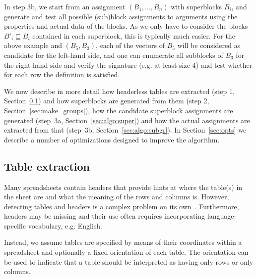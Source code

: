 \documentclass{IEEEtran}
\newcommand{\sbs}{B}
\newcommand{\sbl}[1]{\ensuremath{\sbs_{\textit{#1}}}}
\newcommand{\ssbl}[1]{\ensuremath{\sbs'_{\textit{#1}}}}
\theoremstyle{definition}
\begin{document}
In step 3b, we start from an assignment $(\sbl{1}, \ldots, \sbl{n})$ with superblocks $\sbl{i}$, and generate and test all possible (sub)block assignments to arguments using the properties and actual data of the blocks. As we only have to consider the blocks $\ssbl{i} \sqsubseteq \sbl{i}$ contained in each superblock, this is typically much easier. For the above example and $(\sbl{5}, \sbl{3})$, each of the vectors of $\sbl{5}$ will be considered as candidate for the left-hand side, and one can enumerate all subblocks of $\sbl{3}$ for the right-hand side and verify the signature (e.g. at least size $4$) and test whether for each row the definition is satisfied. %

We now describe in more detail how headerless tables are extracted (step 1, Section~\ref{sec:table_extraction}) and how superblocks are generated from them (step 2, Section~\ref{sec:make_groups}), how the candidate superblock assignments are generated (step~3a, Section~\ref{sec:algo:super}) and how the actual assignments are extracted from that (step~3b, Section~\ref{sec:algo:subgr}).
In Section~\ref{sec:opts} we describe a number of optimizations designed to improve the algorithm.





\subsection{Table extraction}
\label{sec:table_extraction}
Many spreadsheets contain headers that provide hints at where the table(s) in the sheet are and what the meaning of the rows and columns is. However, detecting tables and headers is a complex problem on its own~\cite{header}. Furthermore, headers may be missing and their use often requires incorporating language-specific vocabulary, e.g. English.


Instead, we assume tables are specified by means of their coordinates within a spreadsheet and optionally a fixed orientation of each table. The orientation can be used to indicate that a table should be interpreted as having only rows or only columns.
\end{document}
